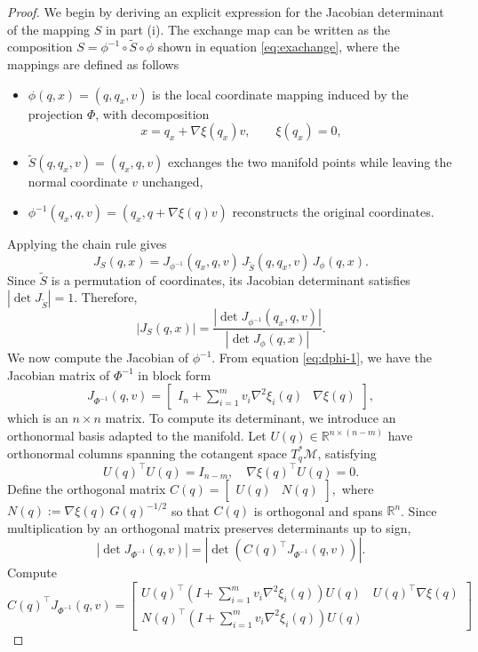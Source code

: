\documentclass[12pt]{article}
\begin{document}
\begin{proof}
We begin by deriving an explicit expression for the Jacobian determinant of the mapping $S$ in part (i). The exchange map can be written as the composition
\(
S = \phi^{-1} \circ \tilde S \circ \phi
\)
shown in equation \eqref{eq:exachange}, where the mappings are defined as follows
\begin{itemize}
\item $\phi(q,x) = (q,q_x,v)$ is the local coordinate mapping induced by the projection $\Phi$, with decomposition
\[
x = q_x + \nabla\xi(q_x)v,\qquad \xi(q_x)=0,
\]
\item $\tilde S(q,q_x,v) = (q_x,q,v)$ exchanges the two manifold points while leaving the normal coordinate $v$ unchanged,
\item $\phi^{-1}(q_x,q,v) = (q_x, q + \nabla\xi(q)v)$ reconstructs the original coordinates.
\end{itemize}
Applying the chain rule gives
\[
J_S(q,x)
=
J_{\phi^{-1}}(q_x,q,v)\,
J_{\tilde S}(q,q_x,v)\,
J_{\phi}(q,x).
\]
Since $\tilde S$ is a permutation of coordinates, its Jacobian determinant satisfies
\(
|\det J_{\tilde S}| = 1.
\)
Therefore,
\[
|J_S(q,x)|
=
\frac{
\left|\det J_{\phi^{-1}}(q_x,q,v)\right|
}{
\left|\det J_{\phi}(q,x)\right|
}.
\]
We now compute the Jacobian of $\phi^{-1}$. From equation \eqref{eq:dphi-1}, we have the Jacobian matrix of $\Phi^{-1}$ in block form
\[
J_{\Phi^{-1}}(q,v)
=
\begin{bmatrix}
I_n + \sum_{i=1}^m v_i \nabla^2\xi_i(q)
&
\nabla\xi(q)
\end{bmatrix},
\]
which is an $n\times n$ matrix.
To compute its determinant, we introduce an orthonormal basis adapted to the manifold. Let
\(
U(q)\in\mathbb R^{n\times (n-m)}
\)
have orthonormal columns spanning the cotangent space $T_q^*\mathcal M$, satisfying
\[
U(q)^\top U(q) = I_{n-m},\quad
\nabla\xi(q)^\top U(q) = 0.
\]
Define the orthogonal matrix
\(
C(q)
=
\begin{bmatrix}
U(q) & N(q)
\end{bmatrix},
\)
where $N(q) := \nabla\xi(q)\, G(q)^{-1/2}$ so that $C(q)$ is orthogonal and spans $\mathbb R^n$.
Since multiplication by an orthogonal matrix preserves determinants up to sign,
\[
|\det J_{\Phi^{-1}}(q,v)|
=
|\det(C(q)^\top J_{\Phi^{-1}}(q,v))|.
\]
Compute
\[
C(q)^\top J_{\Phi^{-1}}(q,v)
=
\begin{bmatrix}
U(q)^\top \left(I + \sum_{i=1}^m v_i \nabla^2\xi_i(q)\right) U(q)
&
U(q)^\top \nabla\xi(q)
\\
N(q)^\top \left(I + \sum_{i=1}^m v_i \nabla^2\xi_i(q)\right) U(q)

\end{bmatrix}\]
\end{proof}
\end{document}
